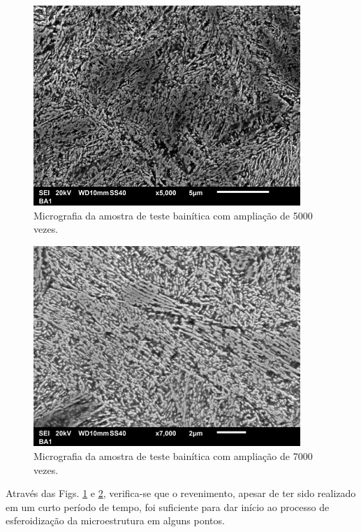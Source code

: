 \documentclass[
12pt,
openany, %
oneside, %
a4paper,			
english,			
brazil			        %
]{abntbibufjf}
\begin{document}
	\begin{figure}[H]
		\centering
		\includegraphics[width=0.9\textwidth]{bainita_5_2}
		\caption{Micrografia da amostra de teste bainítica com ampliação de 5000 vezes.}
		\label{fig:bainita_5_2}
	\end{figure}
	
	\begin{figure}[H]
		\centering
		\includegraphics[width=0.9\textwidth]{bainita_2_1}
		\caption{Micrografia da amostra de teste bainítica com ampliação de 7000 vezes.}
		\label{fig:bainita_2_1}
	\end{figure}
	
	Através das Figs. \ref{fig:bainita_5_2} e \ref{fig:bainita_2_1}, verifica-se que o revenimento, apesar de ter sido realizado em um curto período de tempo, foi suficiente para dar início ao processo de esferoidização da microestrutura em alguns pontos.
	
\end{document}
